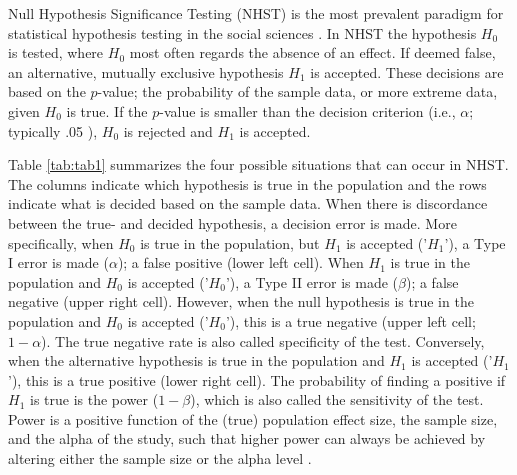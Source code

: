 \documentclass{article}
\begin{document}
Null Hypothesis Significance Testing (NHST) is the most prevalent paradigm for statistical hypothesis testing in the social sciences \cite{American_Psychological_Association2010-qe}. In NHST the hypothesis $H_0$ is tested, where $H_0$ most often regards the absence of an effect. If deemed false, an alternative, mutually exclusive hypothesis $H_1$ is accepted. These decisions are based on the $p$-value; the probability of the sample data, or more extreme data, given $H_0$ is true. If the $p$-value is smaller than the decision criterion (i.e., $\alpha$; typically .05 \cite{Nuijten2015-od}), $H_0$ is rejected and $H_1$ is accepted.

Table \ref{tab:tab1} summarizes the four possible situations that can occur in NHST. The columns indicate which hypothesis is true in the population and the rows indicate what is decided based on the sample data. When there is discordance between the true- and decided hypothesis, a decision error is made. More specifically, when $H_0$ is true in the population, but $H_1$ is accepted ('$H_1$'), a Type I error is made ($\alpha$); a false positive (lower left cell). When $H_1$ is true in the population and $H_0$ is accepted ('$H_0$'), a Type II error is made ($\beta$); a false negative (upper right cell). However, when the null hypothesis is true in the population and $H_0$ is accepted ('$H_0$'), this is a true negative (upper left cell; $1-\alpha$). The true negative rate is also called specificity of the test. Conversely, when the alternative hypothesis is true in the population and $H_1$ is accepted ('$H_1$'), this is a true positive (lower right cell). The probability of finding a positive if $H_1$ is true is the power ($1-\beta$), which is also called the sensitivity of the test. Power is a positive function of the (true) population effect size, the sample size, and the alpha of the study, such that higher power can always be achieved by altering either the sample size or the alpha level \cite{Aberson2010-xa}.
\end{document}
